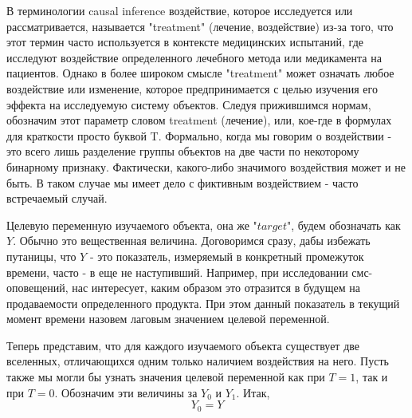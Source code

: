 \documentclass{article}
\begin{document}
        В терминологии causal inference воздействие, которое исследуется или рассматривается, называется "treatment"{} (лечение, воздействие) из-за того, что этот термин часто используется в контексте медицинских испытаний, где исследуют воздействие определенного лечебного метода или медикамента на пациентов. Однако в более широком смысле "treatment"{} может означать любое воздействие или изменение, которое предпринимается с целью изучения его эффекта на исследуемую систему объектов. Следуя прижившимся нормам, обозначим этот параметр словом treatment (лечение), или, кое-где в формулах для краткости просто буквой T. Формально, когда мы говорим о воздействии - это всего лишь разделение группы объектов на две части по некоторому бинарному признаку. Фактически, какого-либо значимого воздействия может и не быть. В таком случае мы имеет дело с фиктивным воздействием - часто встречаемый случай.

        Целевую переменную изучаемого объекта, она же "$target$"{}, будем обозначать как $Y$. Обычно это вещественная величина. Договоримся сразу, дабы избежать путаницы, что $Y$ - это показатель, измеряемый в конкретный промежуток времени, часто - в еще не наступивший. Например, при исследовании смс-оповещений, нас интересует, каким образом это отразится в будущем на продаваемости определенного продукта. При этом данный показатель в текущий момент времени назовем лаговым значением целевой переменной.

        Теперь представим, что для каждого изучаемого объекта существует две вселенных, отличающихся одним только наличием воздействия на него. Пусть также мы могли бы узнать значения целевой переменной как при $T=1$, так и при $T=0$. Обозначим эти величины за $Y_0$ и  $Y_1$. Итак,
        $$
            Y_0 = Y
        $$
\end{document}
